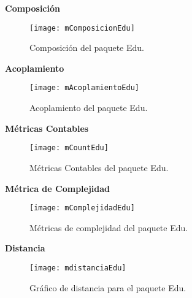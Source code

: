 \textbf{Composición}
\begin{figure}[H]
	\centering
	\texttt{[image: mComposicionEdu]}
	\centering
	\caption{Composición del paquete Edu.}
	\label{fig:mComposicionEdu}
\end{figure}
\textbf{Acoplamiento}
\begin{figure}[H]
	\centering
	\texttt{[image: mAcoplamientoEdu]}
	\centering
	\caption{Acoplamiento del paquete Edu.}
	\label{fig:mAcoplamientoEdu}
\end{figure}
\textbf{Métricas Contables}
\begin{figure}[H]
	\centering
	\texttt{[image: mCountEdu]}
	\centering
	\caption{Métricas Contables del paquete Edu.}
	\label{fig:mCountEdu}
\end{figure}
\textbf{Métrica de Complejidad}
\begin{figure}[H]
	\centering
	\texttt{[image: mComplejidadEdu]}
	\centering
	\caption{Métricas de complejidad del paquete Edu.}
	\label{fig:mComplejidadEdu}
\end{figure}
\clearpage
\textbf{Distancia}
\begin{figure}[H]
	\centering
	\texttt{[image: mdistanciaEdu]}
	\centering
	\caption{Gráfico de distancia para el paquete Edu.}
	\label{fig:mdistanciaEdu}
\end{figure}
